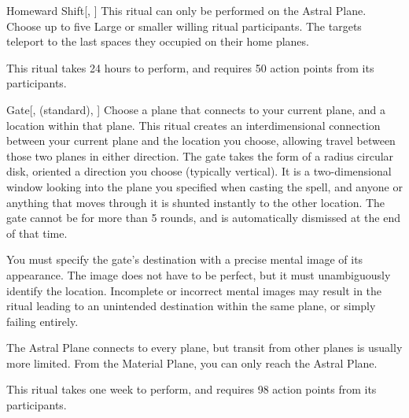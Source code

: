 \lowercase{\hypertarget{spell:Homeward Shift}{}}\label{spell:Homeward Shift}
\begin{apability}[\nth{5}]{\hypertarget{spell:Homeward Shift}{Homeward Shift}}[, ]
This ritual can only be performed on the Astral Plane.
Choose up to five Large or smaller willing ritual participants.
The targets teleport to the last spaces they occupied on their home planes.

This ritual takes 24 hours to perform, and requires 50 action points from its participants.
\end{apability}
\vspace{0.25em}



\lowercase{\hypertarget{spell:Gate}{}}\label{spell:Gate}
\begin{apability}[\nth{7}]{\hypertarget{spell:Gate}{Gate}}[,  (standard), ]
Choose a plane that connects to your current plane, and a location within that plane.
This ritual creates an interdimensional connection between your current plane and the location you choose, allowing travel between those two planes in either direction.
The gate takes the form of a \areasmall radius circular disk, oriented a direction you choose (typically vertical).
It is a two-dimensional window looking into the plane you specified when casting the spell, and anyone or anything that moves through it is shunted instantly to the other location.
The gate cannot be  for more than 5 rounds, and is automatically dismissed at the end of that time.

You must specify the gate's destination with a precise mental image of its appearance.
The image does not have to be perfect, but it must unambiguously identify the location.
Incomplete or incorrect mental images may result in the ritual leading to an unintended destination within the same plane, or simply failing entirely.

The Astral Plane connects to every plane, but transit from other planes is usually more limited.
From the Material Plane, you can only reach the Astral Plane.

This ritual takes one week to perform, and requires 98 action points from its participants.
\end{apability}
\vspace{0.25em}



